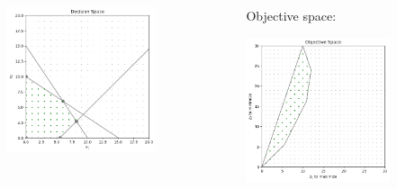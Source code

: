 \documentclass[]{beamer}
\begin{document}
\begin{frame}
\begin{columns}
\begin{column}{0.5\textwidth}
      \begin{center}
      \includegraphics[height=4.25cm]{decisionSpace.png} 
       \end{center}
      \end{column}
      \begin{column}{0.5\textwidth}
      Objective space:
      
      \begin{center}
      \includegraphics[height=4.25cm]{objectiveSpace.png} 
       \end{center}
      \end{column}
      \end{columns} 
 
\end{frame}



% 
%
\end{document}
